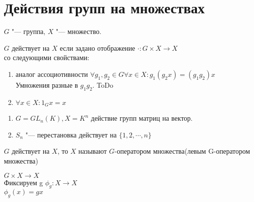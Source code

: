 ﻿\section{Действия групп на множествах}
$G$ "--- группа, $X$ "--- множество.
\begin{Def}
$G$ действует на $X$ если задано отображение $\cdot \colon G \times X \to X$\\
со следующими свойствами:
  \begin{enumerate}
  \item аналог ассоциотивности $\forall g_1, g_2 \in G \forall x \in X \colon g_1(g_2x) = (g_1g_2)x$\\
  Умножения разные в $g_1g_2$. ToDo
  \item $\forall x \in X \colon 1_G x = x$
  \end{enumerate}
\end{Def} 
\begin{exmp}
\begin{enumerate}
\item $G = GL_n(K), X = K^{n}$ 
действие групп матриц на вектор.
\item 
$S_n$ "--- перестановка действует на $\{1, 2, \cdots, n\}$
\end{enumerate}
\end{exmp}
\begin{Def}
$G$ действует на $X$, то $X$ называют $G$-оператором множества(левым G-оператором множества)\\
\end{Def}
$G \times X \to X$\\
Фиксируем g
$\phi_{g}\colon X \to X$\\
$\phi_{g}(x) = gx$\\

